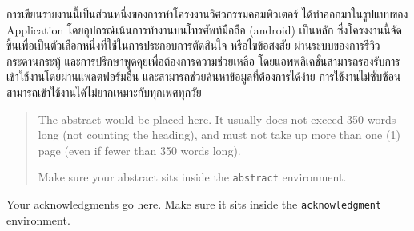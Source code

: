 \maketitle
\makesignature

\ifproject
\begin{abstractTH}

การเขียนรายงานนี้เป็นส่วนหนึ่งของการทําโครงงานวิศวกรรมคอมพิวเตอร์ ได้ทำออกมาในรูปแบบของ Application โดยอุปกรณ์เน้นการทำงานบนโทรศัพท์มือถือ (android) เป็นหลัก ซึ่งโครงงานนี้จัดขึ้นเพื่อเป็นตัวเลือกหนึ่งที่ใช้ในการประกอบการตัดสินใจ หรือไขข้อสงสัย ผ่านระบบของการรีวิว กระดานกระทู้ และการปรึกษาพูดคุยเพื่อต้องการความช่วยเหลือ โดยแอพพลิเคชั่นสามารถรองรับการเข้าใช้งานโดยผ่านแพลตฟอร์มอื่น และสามารถช่วยค้นหาข้อมูลที่ต้องการได้ง่าย การใช้งานไม่ซับซ้อนสามารถเข้าใช้งานได้ไม่ยากเหมาะกับทุกเพศทุกวัย

\end{abstractTH}

\begin{abstract}
The abstract would be placed here. It usually does not exceed 350 words
long (not counting the heading), and must not take up more than one (1) page
(even if fewer than 350 words long).

Make sure your abstract sits inside the \texttt{abstract} environment.
\end{abstract}

\iffalse
\begin{dedication}
This document is dedicated to all Chiang Mai University students.

Dedication page is optional.
\end{dedication}
\fi %

\begin{acknowledgments}
Your acknowledgments go here. Make sure it sits inside the
\texttt{acknowledgment} environment.

\end{acknowledgments}%
\fi %

\contentspage

\ifproject
\figurelistpage

\tablelistpage
\fi %



